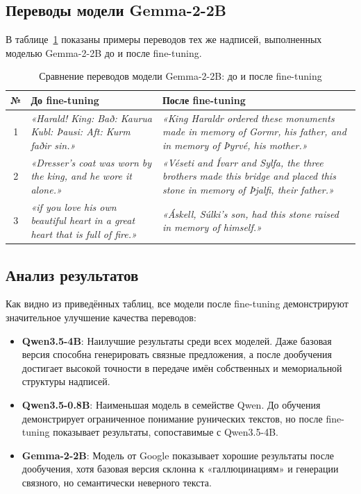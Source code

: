 \documentclass[14pt,a4paper]{extreport}
\begin{document}
\subsection{Переводы модели Gemma-2-2B}

В таблице~\ref{tab:gemma2_comparison} показаны примеры переводов тех же надписей, выполненных моделью Gemma-2-2B до и после fine-tuning.

\begin{table}[H]
\centering
\caption{Сравнение переводов модели Gemma-2-2B: до и после fine-tuning}
\label{tab:gemma2_comparison}
\begin{tabular}{|c|p{}|p{}|}
\hline
\textbf{№} & \textbf{До fine-tuning} & \textbf{После fine-tuning} \\
\hline
1 & \textit{«Harald! King: Bað: Kaurua Kubl: Þausi: Aft: Kurm faðir sin.»} & \textit{«King Haraldr ordered these monuments made in memory of Gormr, his father, and in memory of Þyrvé, his mother.»} \\
\hline
2 & \textit{«Dresser's coat was worn by the king, and he wore it alone.»} & \textit{«Véseti and Ívarr and Sylfa, the three brothers made this bridge and placed this stone in memory of Þjalfi, their father.»} \\
\hline
3 & \textit{«if you love his own beautiful heart in a great heart that is full of fire.»} & \textit{«Áskell, Súlki's son, had this stone raised in memory of himself.»} \\
\hline
\end{tabular}
\end{table}

\subsection{Анализ результатов}

Как видно из приведённых таблиц, все модели после fine-tuning демонстрируют значительное улучшение качества переводов:

\begin{itemize}
    \item \textbf{Qwen3.5-4B}: Наилучшие результаты среди всех моделей. Даже базовая версия способна генерировать связные предложения, а после дообучения достигает высокой точности в передаче имён собственных и мемориальной структуры надписей.
    
    \item \textbf{Qwen3.5-0.8B}: Наименьшая модель в семействе Qwen. До обучения демонстрирует ограниченное понимание рунических текстов, но после fine-tuning показывает результаты, сопоставимые с Qwen3.5-4B.
    
    \item \textbf{Gemma-2-2B}: Модель от Google показывает хорошие результаты после дообучения, хотя базовая версия склонна к «галлюцинациям» и генерации связного, но семантически неверного текста.
\end{itemize}
\end{document}
